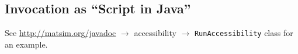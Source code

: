 \subsection{Invocation as ``Script in Java''}

See \url{http://matsim.org/javadoc} $\to$ accessibility $\to$ \lstinline{RunAccessibility} class for an example.





